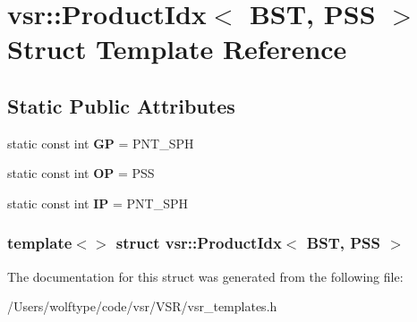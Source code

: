 \hypertarget{structvsr_1_1_product_idx_3_01_b_s_t_00_01_p_s_s_01_4}{\section{vsr\-:\-:Product\-Idx$<$ B\-S\-T, P\-S\-S $>$ Struct Template Reference}
\label{structvsr_1_1_product_idx_3_01_b_s_t_00_01_p_s_s_01_4}
}
\subsection*{Static Public Attributes}
\begin{DoxyCompactItemize}
\item 
\hypertarget{structvsr_1_1_product_idx_3_01_b_s_t_00_01_p_s_s_01_4_aba97db6086bb907d2c3f776b6514e780}{static const int {\bfseries G\-P} = P\-N\-T\-\_\-\-S\-P\-H}\label{structvsr_1_1_product_idx_3_01_b_s_t_00_01_p_s_s_01_4_aba97db6086bb907d2c3f776b6514e780}

\item 
\hypertarget{structvsr_1_1_product_idx_3_01_b_s_t_00_01_p_s_s_01_4_a20a041d1de513cf7f0bb8e408f860ae3}{static const int {\bfseries O\-P} = P\-S\-S}\label{structvsr_1_1_product_idx_3_01_b_s_t_00_01_p_s_s_01_4_a20a041d1de513cf7f0bb8e408f860ae3}

\item 
\hypertarget{structvsr_1_1_product_idx_3_01_b_s_t_00_01_p_s_s_01_4_a45a6c6cf30cb1e5908c581b51e1bae26}{static const int {\bfseries I\-P} = P\-N\-T\-\_\-\-S\-P\-H}\label{structvsr_1_1_product_idx_3_01_b_s_t_00_01_p_s_s_01_4_a45a6c6cf30cb1e5908c581b51e1bae26}

\end{DoxyCompactItemize}
\subsubsection*{template$<$$>$ struct vsr\-::\-Product\-Idx$<$ B\-S\-T, P\-S\-S $>$}



The documentation for this struct was generated from the following file\-:\begin{DoxyCompactItemize}
\item 
/\-Users/wolftype/code/vsr/\-V\-S\-R/vsr\-\_\-templates.\-h\end{DoxyCompactItemize}
